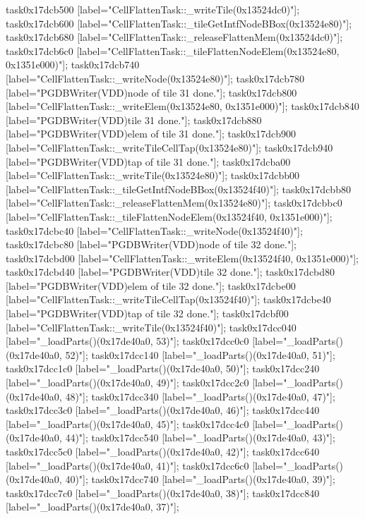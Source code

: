 {	task0x17dcb500 [label="CellFlattenTask::_writeTile(0x13524dc0)"];
	task0x17dcb600 [label="CellFlattenTask::_tileGetIntfNodeBBox(0x13524e80)"];
	task0x17dcb680 [label="CellFlattenTask::_releaseFlattenMem(0x13524dc0)"];
	task0x17dcb6c0 [label="CellFlattenTask::_tileFlattenNodeElem(0x13524e80, 0x1351e000)"];
	task0x17dcb740 [label="CellFlattenTask::_writeNode(0x13524e80)"];
	task0x17dcb780 [label="PGDBWriter(VDD)\nCell node of tile 31 done."];
	task0x17dcb800 [label="CellFlattenTask::_writeElem(0x13524e80, 0x1351e000)"];
	task0x17dcb840 [label="PGDBWriter(VDD)\nCell tile 31 done."];
	task0x17dcb880 [label="PGDBWriter(VDD)\nCell elem of tile 31 done."];
	task0x17dcb900 [label="CellFlattenTask::_writeTileCellTap(0x13524e80)"];
	task0x17dcb940 [label="PGDBWriter(VDD)\nCell tap of tile 31 done."];
	task0x17dcba00 [label="CellFlattenTask::_writeTile(0x13524e80)"];
	task0x17dcbb00 [label="CellFlattenTask::_tileGetIntfNodeBBox(0x13524f40)"];
	task0x17dcbb80 [label="CellFlattenTask::_releaseFlattenMem(0x13524e80)"];
	task0x17dcbbc0 [label="CellFlattenTask::_tileFlattenNodeElem(0x13524f40, 0x1351e000)"];
	task0x17dcbc40 [label="CellFlattenTask::_writeNode(0x13524f40)"];
	task0x17dcbc80 [label="PGDBWriter(VDD)\nCell node of tile 32 done."];
	task0x17dcbd00 [label="CellFlattenTask::_writeElem(0x13524f40, 0x1351e000)"];
	task0x17dcbd40 [label="PGDBWriter(VDD)\nCell tile 32 done."];
	task0x17dcbd80 [label="PGDBWriter(VDD)\nCell elem of tile 32 done."];
	task0x17dcbe00 [label="CellFlattenTask::_writeTileCellTap(0x13524f40)"];
	task0x17dcbe40 [label="PGDBWriter(VDD)\nCell tap of tile 32 done."];
	task0x17dcbf00 [label="CellFlattenTask::_writeTile(0x13524f40)"];
	task0x17dcc040 [label="_loadParts()(0x17de40a0, 53)"];
	task0x17dcc0c0 [label="_loadParts()(0x17de40a0, 52)"];
	task0x17dcc140 [label="_loadParts()(0x17de40a0, 51)"];
	task0x17dcc1c0 [label="_loadParts()(0x17de40a0, 50)"];
	task0x17dcc240 [label="_loadParts()(0x17de40a0, 49)"];
	task0x17dcc2c0 [label="_loadParts()(0x17de40a0, 48)"];
	task0x17dcc340 [label="_loadParts()(0x17de40a0, 47)"];
	task0x17dcc3c0 [label="_loadParts()(0x17de40a0, 46)"];
	task0x17dcc440 [label="_loadParts()(0x17de40a0, 45)"];
	task0x17dcc4c0 [label="_loadParts()(0x17de40a0, 44)"];
	task0x17dcc540 [label="_loadParts()(0x17de40a0, 43)"];
	task0x17dcc5c0 [label="_loadParts()(0x17de40a0, 42)"];
	task0x17dcc640 [label="_loadParts()(0x17de40a0, 41)"];
	task0x17dcc6c0 [label="_loadParts()(0x17de40a0, 40)"];
	task0x17dcc740 [label="_loadParts()(0x17de40a0, 39)"];
	task0x17dcc7c0 [label="_loadParts()(0x17de40a0, 38)"];
	task0x17dcc840 [label="_loadParts()(0x17de40a0, 37)"];
}
